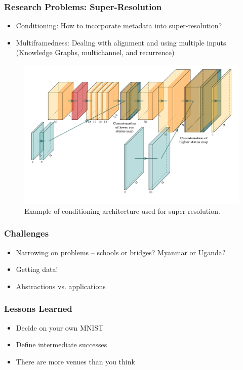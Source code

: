 \documentclass[10pt,mathserif]{beamer}
\begin{document}
\begin{frame}
  \frametitle{Research Problems: Super-Resolution}
  \begin{itemize}
  \item Conditioning: How to incorporate metadata into super-resolution?
  \item Multiframedness: Dealing with alignment and using multiple inputs
    (Knowledge Graphs, multichannel, and recurrence)
  \end{itemize}
  \begin{figure}[ht]
    \centering
    \includegraphics[width=0.6\paperwidth]{figures/conditioning_network}
    \caption{Example of conditioning architecture used for super-resolution. \label{fig:label} }
\end{figure}


\end{frame}

\begin{frame}
  \frametitle{Challenges}
  \begin{itemize}
  \item Narrowing on problems -- schools or bridges? Myanmar or Uganda?
  \item Getting data!
  \item Abstractions vs. applications
  \end{itemize}
\end{frame}

\begin{frame}
  \frametitle{Lessons Learned}
  \begin{itemize}
  \item Decide on your own MNIST
  \item Define intermediate successes
  \item There are more venues than you think
  \end{itemize}
\end{frame}
\end{document}
